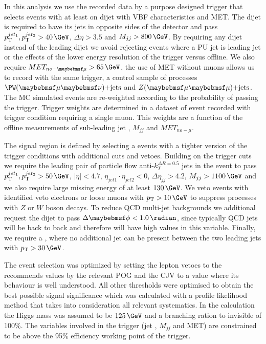 In this analysis we use the recorded data by a purpose designed trigger that selects events with at least on dijet with \gls{VBF} characteristics and \gls{MET}. The dijet is required to have its jets in opposite sides of the detector and pass $\pt^{jet_1},\pt^{jet_2} > 40\,\GeV$, $\Delta\eta > 3.5$ and $M_{jj} > 800\,\GeV$. By requiring any dijet instead of the leading dijet we avoid rejecting events where a \gls{PU} jet is leading jet or the effects of the lower energy resolution of the trigger versus offline. We also require $MET_{no-\mu} > 65\,\GeV$, the use of \gls{MET} without muons allows us to record with the same trigger, a control sample of processes  $\PW(\mu\nu)\text{+jets}$ and $\Z(\mu\mu)\text{+jets}$. The \gls{MC} simulated events are re-weighted according to the probability of passing the trigger. Trigger weights are determined in a dataset of event recorded with trigger condition requiring a single muon. This weights are a function of the offline measurements of sub-leading jet \pt, $M_{jj}$ and $MET_{no-\mu}$.


The signal region is defined by selecting a events with a tighter version of the trigger conditions with additional cuts and vetoes. Building on the trigger cuts we require the leading pair of particle flow \cite{ARTICLE:CMSParticleFlowEventRecontruction} anti-$k_T^{\Delta R=0.5}$ jets in the event to pass $\pt^{jet_1},\pt^{jet_2} > 50\,\GeV$, $|\eta| < 4.7$, $\eta_{jet1} \cdot \eta_{jet2} < 0$, $\Delta\eta_{jj}>4.2$, $M_{jj}>1100\,\GeV$ and we also require large missing energy of at least $130\,\GeV$. We veto events with identified veto electrons or loose muons  with $\pt>10\,\GeV$ to suppress processes with $Z$ or $W$ boson decays. To reduce \gls{QCD} multi-jet backgrounds we additional request the dijet to pass $\Delta\phi < 1.0\,\radian$, since typically \gls{QCD} jets will be back to back and therefore will have high values in this variable. Finally, we require a , where no additional jet can be present between the two leading jets with $\pt > 30\,\GeV$.

The event selection was optimized by setting the lepton vetoes to the recommends values by the relevant \gls{POG} and the \gls{CJV} to a value where its behaviour is well understood. All other thresholds were optimised to obtain the best possible signal significance which was calculated with a profile likelihood method that takes into consideration all relevant systematics. In the calculation the Higgs mass was assumed to be $125\,\GeV$ and a branching ration to invisible of 100\%. The variables involved in the trigger (jet \pt, $M_{jj}$ and \gls{MET}) are constrained to be above the 95\% efficiency working point of the trigger.

